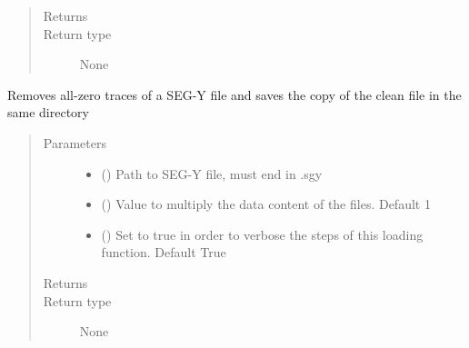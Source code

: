 \documentclass[letterpaper,10pt,english]{sphinxmanual}
\begin{document}
\begin{fulllineitems}
\begin{quote}
\begin{description}
\begin{itemize}
\end{itemize}

\item[{Returns}] \leavevmode


\item[{Return type}] \leavevmode
None

\end{description}\end{quote}

\end{fulllineitems}


\begin{fulllineitems}
\label{\detokenize{index:fullwaveqc.tools.rm_empty_traces}}
Removes all-zero traces of a SEG-Y file and saves the copy of the clean file in the same directory
\begin{quote}\begin{description}
\item[{Parameters}] \leavevmode\begin{itemize}
\item {} 
 () \textendash{} Path to SEG-Y file, must end in .sgy

\item {} 
 (\sphinxstyleliteralemphasis{\sphinxupquote{, }}) \textendash{} Value to multiply the data content of the files. Default 1

\item {} 
 (\sphinxstyleliteralemphasis{\sphinxupquote{, }}) \textendash{} Set to true in order to verbose the steps of this loading function. Default True

\end{itemize}

\item[{Returns}] \leavevmode


\item[{Return type}] \leavevmode
None

\end{description}\end{quote}

\end{fulllineitems}
\end{document}
